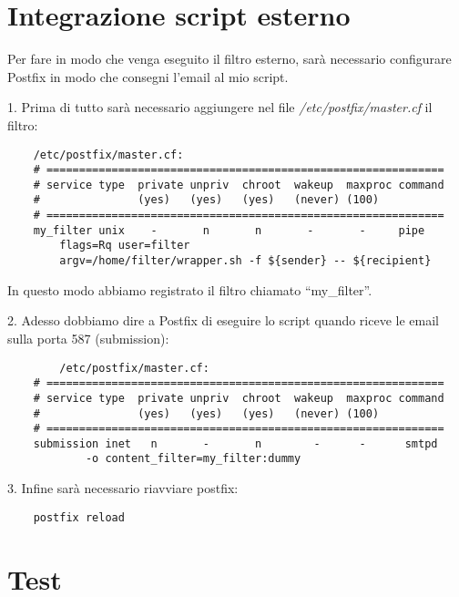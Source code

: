     \section{Integrazione script esterno}
    Per fare in modo che venga eseguito il filtro esterno, sarà necessario configurare Postfix in modo
    che consegni l'email al mio script.
    
    1. Prima di tutto sarà necessario aggiungere nel file \textit{/etc/postfix/master.cf} il filtro:

    \begin{verbatim}
    /etc/postfix/master.cf:
    # =============================================================
    # service type  private unpriv  chroot  wakeup  maxproc command
    #               (yes)   (yes)   (yes)   (never) (100)
    # =============================================================
    my_filter unix	  -	      n	      n	      -	      -	    pipe
	    flags=Rq user=filter 
        argv=/home/filter/wrapper.sh -f ${sender} -- ${recipient}
    \end{verbatim}
    In questo modo abbiamo registrato il filtro chiamato ``my\_filter''.
    
    2. Adesso dobbiamo dire a Postfix di eseguire lo script quando riceve le email sulla porta 587 (submission):

    \begin{verbatim}
        /etc/postfix/master.cf:
    # =============================================================
    # service type  private unpriv  chroot  wakeup  maxproc command
    #               (yes)   (yes)   (yes)   (never) (100)
    # =============================================================
    submission inet   n       -       n        -      -      smtpd
            -o content_filter=my_filter:dummy  
    \end{verbatim}
    
    3. Infine sarà necessario riavviare postfix:

    \begin{verbatim}
    postfix reload 
    \end{verbatim}
    

    \section{Test}